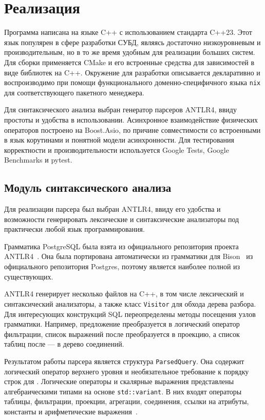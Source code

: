 \documentclass[fontsize=14pt, russian]{scrartcl}
\begin{document}

\section{Реализация}

Программа написана на языке C++ с использованием стандарта C++23. Этот язык
популярен в сфере разработки СУБД, являясь достаточно низкоуровневым и
производительным, но в то же время удобным для реализации больших систем. Для
сборки применяется CMake и его встроенные средства для зависимостей в виде
библиотек на C++. Окружение для разработки описывается декларативно и
воспроизводимо при помощи функционального доменно-специфичного языка \verb|nix|
для соответствующего пакетного менеджера.

Для синтаксического анализа выбран генератор парсеров ANTLR4, ввиду простоты и
удобства в использовании. Асинхронное взаимодействие физических операторов
построено на Boost.Asio, по причине совместимости со встроенными в язык
корутинами и понятной модели асинхронности. Для тестирования корректности и
производительности используется Google Tests, Google Benchmarks и pytest.

\subsection{Модуль синтаксического анализа}

Для реализации парсера был выбран ANTLR4, ввиду его удобства и возможности
генерировать лексические и синтаксические анализаторы под практически любой язык
программирования.

Грамматика PostgreSQL была взята из официального репозитория проекта
ANTLR4~\cite{Antlr4PostgreSQL}. Она была портирована автоматически из грамматики
для Bison~\cite{PostgresBisonGrammar} из официального репозитория Postgres,
поэтому является наиболее полной из существующих.

ANTLR4 генерирует несколько файлов на C++, в том числе лексический и
синтаксический анализаторы, а также класс \verb|Visitor| для обхода дерева
разбора. Для интересующих конструкций SQL переопределены методы посещения узлов
грамматики. Например, предложение \WHERE{} преобразуется в логический оператор
фильтрации, список выражений после \SELECT{} преобразуется в проекцию, а список
таблиц после \FROM{} --- в дерево соединений.

Результатом работы парсера является структура \texttt{ParsedQuery}. Она содержит
логический оператор верхнего уровня и необязательное требование к порядку строк
для \ORDERBY{}. Логические операторы и скалярные выражения представлены
алгебраическими типами на основе \texttt{std::variant}. В них входят операторы
таблицы, фильтрации, проекции, агрегации, соединения, ссылки на атрибуты,
константы и арифметические выражения~.
\end{document}
